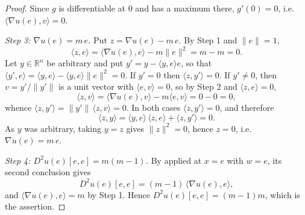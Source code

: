 \begin{proof}
Since $g$ is differentiable at $0$ and has a maximum there, $g'(0)=0$, i.e.
$\langle\nabla u(e),v\rangle=0$.

\emph{Step 3: $\nabla u(e)=m\,e$.} Put $z=\nabla u(e)-m\,e$. By Step 1 and
$\lVert e\rVert=1$,
\[
  \langle z,e\rangle=\langle\nabla u(e),e\rangle-m\lVert e\rVert^2=m-m=0 .
\]
Let $y\in\mathbb{R}^n$ be arbitrary and put $y'=y-\langle y,e\rangle e$, so that
$\langle y',e\rangle=\langle y,e\rangle-\langle y,e\rangle\lVert e\rVert^2=0$.
If $y'=0$ then $\langle z,y'\rangle=0$. If $y'\ne0$, then
$v=y'/\lVert y'\rVert$ is a unit vector with $\langle e,v\rangle=0$, so by
Step 2 and $\langle z,e\rangle=0$,
\[
  \langle z,v\rangle=\langle\nabla u(e),v\rangle-m\langle e,v\rangle=0-0=0 ,
\]
whence $\langle z,y'\rangle=\lVert y'\rVert\,\langle z,v\rangle=0$. In both
cases $\langle z,y'\rangle=0$, and therefore
\[
  \langle z,y\rangle=\langle y,e\rangle\,\langle z,e\rangle+\langle z,y'\rangle=0 .
\]
As $y$ was arbitrary, taking $y=z$ gives $\lVert z\rVert^2=0$, hence $z=0$, i.e.
$\nabla u(e)=m\,e$.

\emph{Step 4: $D^2u(e)[e,e]=m(m-1)$.} By  applied at
$x=e$ with $w=e$, its second conclusion gives
\[
  D^2u(e)[e,e]=(m-1)\,\langle\nabla u(e),e\rangle ,
\]
and $\langle\nabla u(e),e\rangle=m$ by Step 1. Hence $D^2u(e)[e,e]=(m-1)m$,
which is the assertion.
\end{proof}
